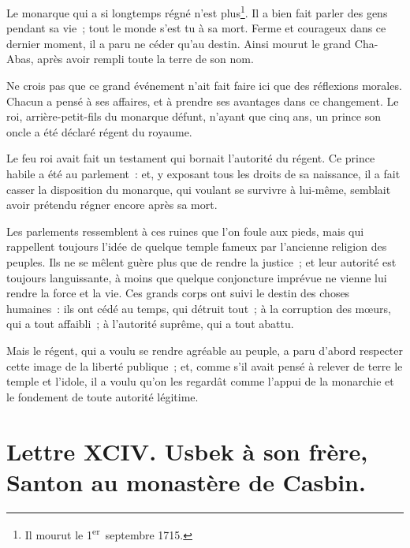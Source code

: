 \documentclass[french,twoside]{book} %
\newcommand{\dateline}[1]{\medskip{\RaggedLeft{#1}\par}\bigskip}
\begin{document}
\noindent Le monarque qui a si longtemps régné n’est plus\footnote{Il mourut le 1\textsuperscript{er} septembre 1715.}. Il a bien fait parler des gens pendant sa vie ; tout le monde s’est tu à sa mort. Ferme et courageux dans ce dernier moment, il a paru ne céder qu’au destin. Ainsi mourut le grand Cha-Abas, après avoir rempli toute la terre de son nom.\par
Ne crois pas que ce grand événement n’ait fait faire ici que des réflexions morales. Chacun a pensé à ses affaires, et à prendre ses avantages dans ce changement. Le roi, arrière-petit-fils du monarque défunt, n’ayant que cinq ans, un prince son oncle a été déclaré régent du royaume.\par
Le feu roi avait fait un testament qui bornait l’autorité du régent. Ce prince habile a été au parlement : et, y exposant tous les droits de sa naissance, il a fait casser la disposition du monarque, qui voulant se survivre à lui-même, semblait avoir prétendu régner encore après sa mort.\par
Les parlements ressemblent à ces ruines que l’on foule aux pieds, mais qui rappellent toujours l’idée de quelque temple fameux par l’ancienne religion des peuples. Ils ne se mêlent guère plus que de rendre la justice ; et leur autorité est toujours languissante, à moins que quelque conjoncture imprévue ne vienne lui rendre la force et la vie. Ces grands corps ont suivi le destin des choses humaines : ils ont cédé au temps, qui détruit tout ; à la corruption des mœurs, qui a tout affaibli ; à l’autorité suprême, qui a tout abattu.\par
Mais le régent, qui a voulu se rendre agréable au peuple, a paru d’abord respecter cette image de la liberté publique ; et, comme s’il avait pensé à relever de terre le temple et l’idole, il a voulu qu’on les regardât comme l’appui de la monarchie et le fondement de toute autorité légitime.\par

\dateline{À Paris, le 4 de la lune de Rhégeb, 1715.}
\section[{Lettre XCIV. Usbek à son frère, Santon au monastère de Casbin.}]{Lettre XCIV. Usbek à son frère, Santon au monastère de Casbin.}\renewcommand{\leftmark}{Lettre XCIV. Usbek à son frère, Santon au monastère de Casbin.}
\end{document}
